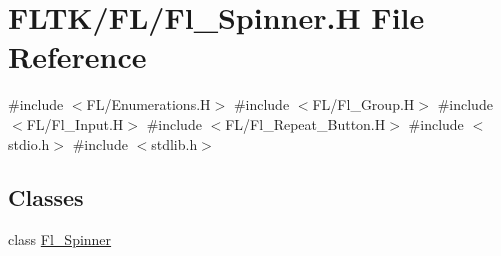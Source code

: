 \hypertarget{_fl___spinner_8_h}{}\section{F\+L\+T\+K/\+F\+L/\+Fl\+\_\+\+Spinner.H File Reference}
\label{_fl___spinner_8_h}
{\ttfamily \#include $<$F\+L/\+Enumerations.\+H$>$}\newline
{\ttfamily \#include $<$F\+L/\+Fl\+\_\+\+Group.\+H$>$}\newline
{\ttfamily \#include $<$F\+L/\+Fl\+\_\+\+Input.\+H$>$}\newline
{\ttfamily \#include $<$F\+L/\+Fl\+\_\+\+Repeat\+\_\+\+Button.\+H$>$}\newline
{\ttfamily \#include $<$stdio.\+h$>$}\newline
{\ttfamily \#include $<$stdlib.\+h$>$}\newline
\subsection*{Classes}
\begin{DoxyCompactItemize}
\item 
class \hyperlink{class_fl___spinner}{Fl\+\_\+\+Spinner}
\end{DoxyCompactItemize}
